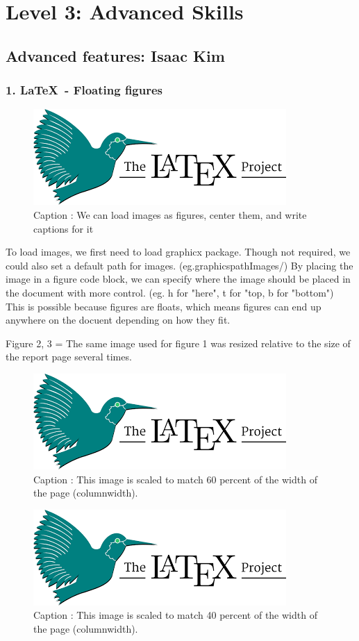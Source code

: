 \documentclass[a4paper, 11pt]{report}
\begin{document}

\newpage
\section{Level 3: Advanced Skills}

\subsection{Advanced features: Isaac Kim}

\subsubsection{1. \LaTeX\ - Floating figures}
\begin{figure}[htp]
\centerline{\includegraphics{latexLogo.png}}
\caption{Caption : We can load images as figures, center them, and write captions for it}
\label{fig}
\end{figure}
To load images, we first need to load graphicx package. Though not required, we could also set a default path for images. (eg.graphicspath{{Images/}}) By placing the image in a figure code block, we can specify where the image should be placed in the document with more control. (eg. h for "here", t for "top, b for "bottom") This is possible because figures are floats, which means figures can end up anywhere on the docuent depending on how they fit. 

Figure 2, 3 = The same image used for figure 1 was resized relative to the size of the report page several times.
\begin{figure}[h]
\centering
\includegraphics[width=0.6\columnwidth]{latexLogo.png}
\caption{Caption : This image is scaled to match 60 percent of the width of the page (columnwidth).}
\label{fig}
\end{figure}
\begin{figure}[h]
\centering
\includegraphics[width=0.4\columnwidth]{latexLogo.png}
\caption{Caption : This image is scaled to match 40 percent of the width of the page (columnwidth).}
\label{fig}
\end{figure}
\end{document}
